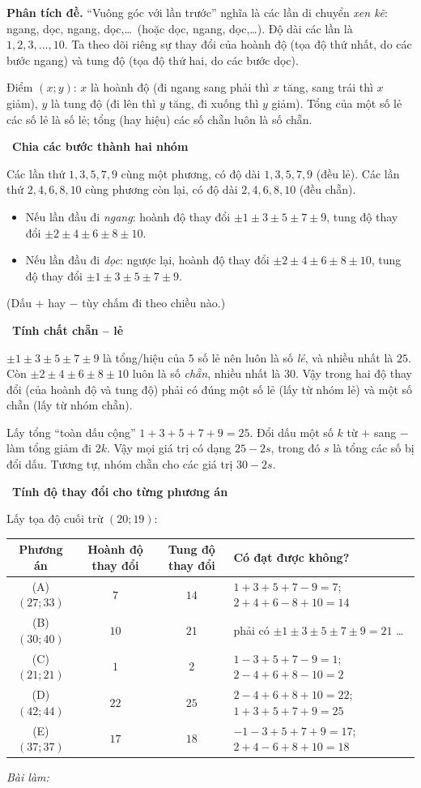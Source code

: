 \documentclass[11pt]{article}
\newif\ifsol \solfalse
\newcommand{\probsol}[1]{%
  \begin{lrbox}{\solmeasure}\begin{minipage}{\dimexpr\linewidth-24pt\relax}#1\end{minipage}\end{lrbox}%
  \ifsol
    \begin{solbox}#1\end{solbox}%
  \else
    \setlength{\solht}{\dimexpr\ht\solmeasure+\dp\solmeasure+0.85cm\relax}%
    \ifdim\solht<1.35cm\setlength{\solht}{1.35cm}\fi
    \ifdim\solht>\StudentMaxWork\setlength{\solht}{\StudentMaxWork}\fi
    \begin{tcolorbox}[colback=white,colframe=Line,boxrule=0.8pt,arc=5pt,
      left=8pt,right=8pt,top=4pt,bottom=4pt,height=\solht]{\footnotesize\color{Slate}\itshape\WorkWord}\end{tcolorbox}%
  \fi}
\newlength{\StudentMaxWork}\setlength{\StudentMaxWork}{7.5cm}
\newcommand{\step}[2]{\par\smallskip\noindent{\bfseries\color{tmBlue!85!black}\StepWord~#1.}\ {\bfseries #2}\par\nopagebreak}
\def\WorkWord{Bài làm:}
\def\StepWord{Bước}
\begin{document}
\probsol{
\textbf{Phân tích đề.} ``Vuông góc với lần trước'' nghĩa là các lần di chuyển \emph{xen kẽ}: ngang, dọc, ngang, dọc,\dots\ (hoặc dọc, ngang, dọc,\dots). Độ dài các lần là $1,2,3,\dots,10$. Ta theo dõi riêng sự thay đổi của hoành độ (tọa độ thứ nhất, do các bước ngang) và tung độ (tọa độ thứ hai, do các bước dọc).

\begin{recallbox}Điểm $(x;y)$: $x$ là hoành độ (đi ngang sang phải thì $x$ tăng, sang trái thì $x$ giảm), $y$ là tung độ (đi lên thì $y$ tăng, đi xuống thì $y$ giảm). Tổng của một số lẻ các số lẻ là số lẻ; tổng (hay hiệu) các số chẵn luôn là số chẵn.\end{recallbox}

\step{1}{Chia các bước thành hai nhóm}
Các lần thứ $1,3,5,7,9$ cùng một phương, có độ dài $1,3,5,7,9$ (đều lẻ). Các lần thứ $2,4,6,8,10$ cùng phương còn lại, có độ dài $2,4,6,8,10$ (đều chẵn).
\begin{itemize}[leftmargin=1.4em,itemsep=1pt]
\item Nếu lần đầu đi \emph{ngang}: hoành độ thay đổi $\pm1\pm3\pm5\pm7\pm9$, tung độ thay đổi $\pm2\pm4\pm6\pm8\pm10$.
\item Nếu lần đầu đi \emph{dọc}: ngược lại, hoành độ thay đổi $\pm2\pm4\pm6\pm8\pm10$, tung độ thay đổi $\pm1\pm3\pm5\pm7\pm9$.
\end{itemize}
(Dấu $+$ hay $-$ tùy chấm đi theo chiều nào.)

\step{2}{Tính chất chẵn -- lẻ}
$\pm1\pm3\pm5\pm7\pm9$ là tổng/hiệu của $5$ số lẻ nên luôn là số \emph{lẻ}, và nhiều nhất là $25$. Còn $\pm2\pm4\pm6\pm8\pm10$ luôn là số \emph{chẵn}, nhiều nhất là $30$. Vậy trong hai độ thay đổi (của hoành độ và tung độ) phải có đúng một số lẻ (lấy từ nhóm lẻ) và một số chẵn (lấy từ nhóm chẵn).

\begin{proofbox}Lấy tổng ``toàn dấu cộng'' $1+3+5+7+9=25$. Đổi dấu một số $k$ từ $+$ sang $-$ làm tổng giảm đi $2k$. Vậy mọi giá trị có dạng $25-2s$, trong đó $s$ là tổng các số bị đổi dấu. Tương tự, nhóm chẵn cho các giá trị $30-2s$.\end{proofbox}

\step{3}{Tính độ thay đổi cho từng phương án}
Lấy tọa độ cuối trừ $(20;19)$:
\begin{center}
\small\begin{tabularx}{\linewidth}{|c|c|c|X|}
\hline
\rowcolor{Tint}\textbf{Phương án} & \textbf{Hoành độ thay đổi} & \textbf{Tung độ thay đổi} & \textbf{Có đạt được không?}\\
\hline
(A) $(27;33)$ & $7$ & $14$ & $1+3+5+7-9=7$; $2+4+6-8+10=14$ \\
(B) $(30;40)$ & $10$ & $21$ & phải có $\pm1\pm3\pm5\pm7\pm9=21$ \dots\\
(C) $(21;21)$ & $1$ & $2$ & $1-3+5+7-9=1$; $2-4+6+8-10=2$\\
(D) $(42;44)$ & $22$ & $25$ & $2-4+6+8+10=22$; $1+3+5+7+9=25$\\
(E) $(37;37)$ & $17$ & $18$ & $-1-3+5+7+9=17$; $2+4-6+8+10=18$\\
\hline
\end{tabularx}
\end{center}

}
\end{document}
